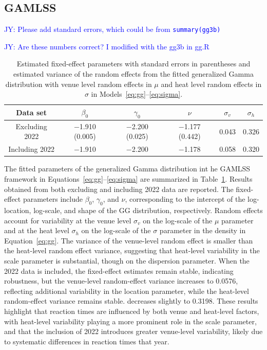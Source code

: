 \documentclass[12pt, letterpaper]{article}
\newcommand{\jy}[1]{\textcolor{blue}{JY: #1}}
\begin{document}
\subsection{GAMLSS} \label{subsec:Results_GLMM}

\jy{Please add standard errors, which could be from \texttt{summary(gg3b)}}

\jy{Are these numbers correct? I modified with the gg3b in gg.R}

\begin{table}
  \centering
  \caption{Estimated fixed-effect parameters with standard errors in
    parentheses and estimated variance of the random effects from the
    fitted generalized Gamma distribution with venue level random
    effects in $\mu$ and heat level random effects in $\sigma$ in
    Models~\eqref{eq:gg}--\eqref{eq:sigma}.}
  \label{tab:ggfit}
  \begin{tabular}{c c c c c c}
    \toprule
    Data set & $\beta_0$ & $\gamma_0$ & $\nu$ & $\sigma_v$ & $\sigma_h$ \\
    \midrule
    Excluding 2022 & $-$1.910 (0.005)  & $-$2.200 (0.025) & $-$1.177 (0.442) & 0.043 & 0.326 \\
    Including 2022 & $-$1.910 & $-$2.200 & $-$1.178 & 0.058 & 0.320 \\
    \bottomrule
  \end{tabular}
\end{table}


The fitted parameters of the generalized Gamma distribution int he
GAMLSS framework in Equations~\eqref{eq:gg}--\eqref{eq:sigma} are
summarized in Table~\ref{tab:ggfit}. Results obtained from both
excluding and including 2022 data are reported. The fixed-effect
parameters include $\beta_0$, $\gamma_0$, and $\nu$, corresponding to
the intercept of the log-location, log-scale, and shape of the GG
distribution, respectively. Random effects account for variability at
the venue level $\sigma_v$ on the log-scale of the $\mu$ parameter
and at the heat level $\sigma_h$ on the log-scale of the $\sigma$
parameter in the density in Equation~\eqref{eq:gg}. The variance 
of the venue-level random effect is smaller than the heat-level random
effect variance, suggesting that heat-level variability in the scale
parameter is substantial, though on the dispersion parameter. When the
2022 data is included, the fixed-effect estimates remain stable, 
indicating robustness, but the venue-level random-effect variance
increases to 0.0576, reflecting additional variability in the location
parameter, while the heat-level random-effect variance remains stable.
decreases slightly to 0.3198. These results
highlight that reaction times are influenced by both venue and heat-level 
factors, with heat-level variability playing a more prominent role in the scale 
parameter, and that the inclusion of 2022 introduces greater venue-level 
variability, likely due to systematic differences in reaction times that year.
\end{document}

